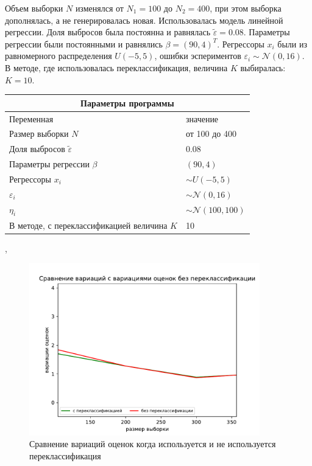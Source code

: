 Объем выборки $N$ изменялся от $N_1=100$ до $N_2=400$, при этом выборка дополнялась, а не генерировалась новая. Использовалась модель линейной регрессии. Доля выбросов была постоянна и равнялась $\widetilde{\varepsilon}=0.08$. Параметры регрессии были постоянными и равнялись $\beta=(90,4)^T$. 
Регрессоры $x_i$ были из равномерного распределения $U(-5,5)$, ошибки эспериментов $\varepsilon_i\sim \mathcal{N}(0,16)$. В методе, где использовалась переклассификация, величина $K$ выбиралась: $K=10$.
\vspace{3cm}
\begin{center}
    \label{tab1}
    \begin{tabular}{|p{5cm}|p{5cm}|}
        \hline
        \multicolumn{2}{|c|}{Параметры программы} \\
        \hline
        Переменная&значение\\
        \hline
        Размер выборки $N$& от 100 до 400\\
        \hline
        Доля выбросов $\widetilde{\varepsilon}$& 0.08\\
        \hline
        Параметры регрессии $\beta$& $(90,4)$\\
        \hline
        Регрессоры $x_i$ & $\sim U(-5,5)$\\
        \hline
        $\varepsilon_i$&$\sim \mathcal{N}(0,16)$\\
        \hline
        $\eta_i$&$\sim \mathcal{N}(100,100)$\\
        \hline
        В методе, с переклассификацией величина $K$& 10\\
        \hline
    \end{tabular},
\end{center}

\begin{figure}[ht!]
    \centering
    \includegraphics[width=100mm]{../images/on_off_recl.pdf}
    \caption{Сравнение вариаций оценок когда используется и не используется переклассификация\label{overflow}}
    \label{pic2}
\end{figure}

